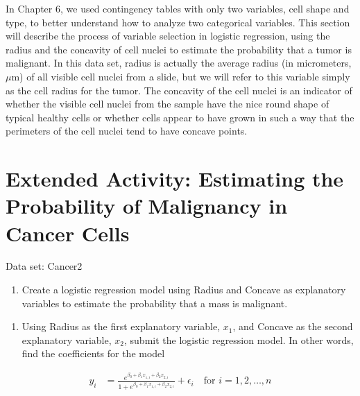 \documentclass[
]{report}
\providecommand{\tightlist}{%
  \setlength{\itemsep}{0pt}\setlength{\parskip}{0pt}}
\begin{document}
In Chapter 6, we used contingency tables with only two variables, cell shape and type, to better understand how to analyze two categorical variables. This section will describe the process of variable selection in logistic regression, using the radius and the concavity of cell nuclei to estimate the probability that a tumor is malignant. In this data set, radius is actually the average radius (in micrometers, \(\mu\)m) of all visible cell nuclei from a slide, but we will refer to this variable simply as the cell radius for the tumor. The concavity of the cell nuclei is an indicator of whether the visible cell nuclei from the sample have the nice round shape of typical healthy cells or whether cells appear to have grown in such a way that the perimeters of the cell nuclei tend to have concave points.

\hypertarget{extended-activity-estimating-the-probability-of-malignancy-in-cancer-cells}{%
\section*{Extended Activity: Estimating the Probability of Malignancy in Cancer Cells}\label{extended-activity-estimating-the-probability-of-malignancy-in-cancer-cells}}

Data set: Cancer2

\begin{enumerate}
\def\labelenumi{\arabic{enumi}.}
\setcounter{enumi}{14}
\tightlist
\item
  Create a logistic regression model using Radius and Concave as explanatory variables to estimate the probability that a mass is malignant.\\
\end{enumerate}

\begin{enumerate}
\def\labelenumi{\alph{enumi}.}
\tightlist
\item
  Using Radius as the first explanatory variable, \(x_1\), and Concave as the second explanatory variable, \(x_2\), submit the logistic regression model. In other words, find the coefficients for the model
\end{enumerate}

\begin{align}
   y_i &= \frac{e^{\beta_0 + \beta_1 x_{1,i} + \beta_2 x_{2,i}}}{1 + e^{\beta_0 + \beta_1 x_{1,i} + \beta_2 x_{2,i}}} + \epsilon_i \quad \text{for } i = 1,2,\dots,n
\end{align}
\end{document}
